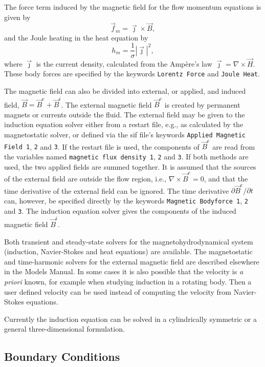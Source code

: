 \begin{versiona}
The force term induced by the magnetic field for the flow momentum equations
is given by
\begin{equation}
\vec{f}_m = \vec{\jmath}\times\vec{B},
\end{equation}
and the Joule heating in the heat equation by
\begin{equation}
h_m = \frac{1}{\sigma}\left|\vec{\jmath}\right|^2,
\end{equation}
where $\vec{\jmath}$ is the current density, calculated from the Amp\`{e}re's
law $\vec{\jmath}=\nabla\times\vec{H}$. These body forces are specified by
the keywords {\tt Lorentz Force} and {\tt Joule Heat}.

The magnetic field can also be divided into external, or applied, and induced
field, $\vec{B}=\vec{B}^e+\vec{B}^i$. The external magnetic field $\vec{B}^e$
is created by permanent magnets or currents outside the fluid. The external
field may be given to the induction equation solver either from a restart file,
e.g., as calculated by the magnetostatic solver, or defined via the sif file's
keywords {\tt Applied Magnetic Field 1}, {\tt 2} and {\tt 3}. If the
restart file is used, the components of $\vec{B}^e$ are read from the variables
named {\tt magnetic flux density 1}, {\tt 2} and {\tt 3}. If both methods are
used, the two applied fields are summed together. It is assumed that the
sources of the external field are outside the flow region, i.e.,
$\nabla\times\vec{B}^e=0$, and that the time derivative of the external field
can be ignored. The time derivative $\partial\vec{B}^e/\partial t$ can,
however, be specified directly by the keywords {\tt Magnetic Bodyforce 1},
{\tt 2} and {\tt 3}. The induction
equation solver gives the components of the induced magnetic field $\vec{B}^i$.

Both transient and steady-state solvers for the magnetohydrodynamical
system (induction, Navier-Stokes and heat equations) are available. The
magnetostatic and time-harmonic solvers for the external magnetic field are
described elsewhere in the Models Manual. In some cases it is also
possible that the velocity is {\em a priori} known, for example when
studying induction in a rotating body. Then a user defined velocity
can be used instead of computing the velocity from Navier-Stokes
equations.

Currently the induction equation can be solved in a cylindrically symmetric or
a general three-dimensional formulation.

\subsection{Boundary Conditions}


\end{versiona}
